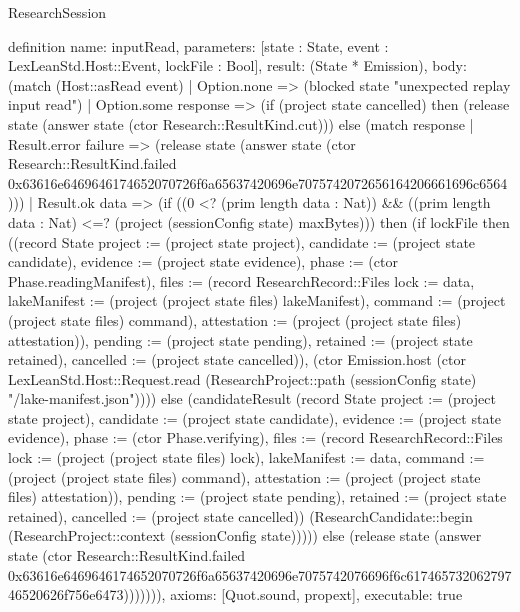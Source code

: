 \begin{lexlean}{ResearchSession}
\begin{semanticmodule}
definition{
 name: inputRead,
 parameters: [state : State, event : LexLeanStd.Host::Event, lockFile : Bool],
 result: (State * Emission),
 body: (match (Host::asRead event) | Option.none => (blocked state "unexpected replay input read") | Option.some response => (if (project state cancelled) then (release state (answer state (ctor Research::ResultKind.cut))) else (match response | Result.error failure => (release state (answer state (ctor Research::ResultKind.failed 0x63616e6469646174652070726f6a65637420696e7075742072656164206661696c6564))) | Result.ok data => (if ((0 <? (prim length data : Nat)) && ((prim length data : Nat) <=? (project (sessionConfig state) maxBytes))) then (if lockFile then ((record State {project := (project state project), candidate := (project state candidate), evidence := (project state evidence), phase := (ctor Phase.readingManifest), files := (record ResearchRecord::Files {lock := data, lakeManifest := (project (project state files) lakeManifest), command := (project (project state files) command), attestation := (project (project state files) attestation)}), pending := (project state pending), retained := (project state retained), cancelled := (project state cancelled)}), (ctor Emission.host (ctor LexLeanStd.Host::Request.read (ResearchProject::path (sessionConfig state) "/lake-manifest.json")))) else (candidateResult (record State {project := (project state project), candidate := (project state candidate), evidence := (project state evidence), phase := (ctor Phase.verifying), files := (record ResearchRecord::Files {lock := (project (project state files) lock), lakeManifest := data, command := (project (project state files) command), attestation := (project (project state files) attestation)}), pending := (project state pending), retained := (project state retained), cancelled := (project state cancelled)}) (ResearchCandidate::begin (ResearchProject::context (sessionConfig state))))) else (release state (answer state (ctor Research::ResultKind.failed 0x63616e6469646174652070726f6a65637420696e7075742076696f6c61746573206279746520626f756e6473))))))),
 axioms: [Quot.sound, propext],
 executable: true
}


\end{semanticmodule}
\end{lexlean}
